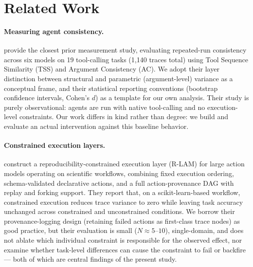\documentclass[11pt]{article}
\begin{document}
\section{Related Work}

\paragraph{Measuring agent consistency.} \cite{yagubyan2026} provide the closest prior measurement study, evaluating repeated-run consistency across six models on 19 tool-calling tasks (1{,}140 traces total) using Tool Sequence Similarity (TSS) and Argument Consistency (AC). We adopt their layer distinction between structural and parametric (argument-level) variance as a conceptual frame, and their statistical reporting conventions (bootstrap confidence intervals, Cohen's $d$) as a template for our own analysis. Their study is purely observational: agents are run with native tool-calling and no execution-level constraints. Our work differs in kind rather than degree: we build and evaluate an actual intervention against this baseline behavior.

\paragraph{Constrained execution layers.} \cite{rlam2026} construct a reproducibility-constrained execution layer (R-LAM) for large action models operating on scientific workflows, combining fixed execution ordering, schema-validated declarative actions, and a full action-provenance DAG with replay and forking support. They report that, on a scikit-learn-based workflow, constrained execution reduces trace variance to zero while leaving task accuracy unchanged across constrained and unconstrained conditions. We borrow their provenance-logging design (retaining failed actions as first-class trace nodes) as good practice, but their evaluation is small ($N \approx 5$--$10$), single-domain, and does not ablate which individual constraint is responsible for the observed effect, nor examine whether task-level differences can cause the constraint to fail or backfire --- both of which are central findings of the present study.
\end{document}
